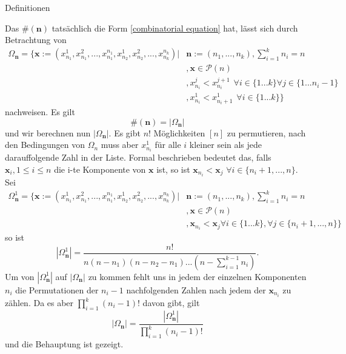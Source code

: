 \begin{section}{Definitionen}
\begin{Bemerkung}
    Das $\#(\textbf{n})$ tatsächlich die Form \ref{combinatorial equation} hat, lässt sich durch Betrachtung von
    \begin{align*}
   \Omega_{\textbf{n}} = \{ \textbf{x}:= (x_{n_1}^{1},x_{n_1}^{2},...,x_{n_1}^{n_1},x_{n_2}^{1},x_{n_2}^{2},...,x_{n_k}^{n_k})|& \textbf{n}:= (n_1,...,n_k), \sum_{i=1}^{k}n_i=  n \\
   &,\textbf{x} \in \mathcal{P}(n)\\
   &, x_{n_i}^j < x_{n_i}^{j+1}\hspace{5pt} \forall  i \in \{1...k\} \forall j \in \{1...n_i-1\} \\
   &, x^1_{n_i} < x^1_{n_i+1} \hspace{5pt} \forall i \in \{1...k\}\}
    \end{align*} 
    nachweisen. Es gilt
    \[
   \#(\textbf{n}) =  |\Omega_\textbf{n}|
    \]
    und wir berechnen nun $|\Omega_\textbf{n}|$. Es gibt $n!$ Möglichkeiten $[n]$ zu permutieren, nach den Bedingungen von $\Omega_n$ muss aber $x_{n_i}^1$ für alle $i$ kleiner sein als jede darauffolgende Zahl in der Liste. Formal beschrieben bedeutet das, falls $\textbf{x}_i, 1 \leq i \leq n$ die i-te Komponente von $\textbf{x}$ ist, so ist $\textbf{x}_{n_i} < \textbf{x}_{j}$ $\forall i \in \{n_i+1,...,n\}$. Sei  
    \begin{align*}
   \Omega^1_{\textbf{n}} = \{ \textbf{x}:= (x_{n_1}^{1},x_{n_1}^{2},...,x_{n_1}^{n_1},x_{n_2}^{1},x_{n_2}^{2},...,x_{n_k}^{n_k})|& \textbf{n}:= (n_1,...,n_k), \sum_{i=1}^{k}n_i=  n \\
   &,\textbf{x} \in \mathcal{P}(n)\\
   &, \textbf{x}_{n_i} < \textbf{x}_j \forall i \in \{1...k\},\forall j \in \{n_i+1,...,n\}\}
    \end{align*} 
    so ist
    \[
    |\Omega^1_{\textbf{n}}| = \frac{n!}{n(n-n_1)(n-n_2-n_1)...(n-\sum_{i=1}^{k-1}n_i)}.
    \]
    Um von $|\Omega_\textbf{n}^1|$ auf $|\Omega_\textbf{n}|$ zu kommen fehlt uns in jedem der einzelnen Komponenten $n_i$ die Permutationen der $n_i -1$ nachfolgenden Zahlen nach jedem der $\textbf{x}_{n_i}$ zu zählen. Da es aber $\prod_{i=1}^{k}(n_i-1)!$ davon gibt, gilt 
    \[
     |\Omega_\textbf{n}| = \frac{|\Omega_\textbf{n}^1|}{\prod_{i=1}^{k}(n_i-1)!}
    \]
    und die Behauptung ist gezeigt.
\end{Bemerkung}
\end{section}